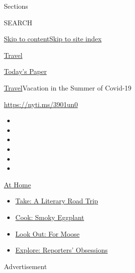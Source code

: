 Sections

SEARCH

\protect\hyperlink{site-content}{Skip to
content}\protect\hyperlink{site-index}{Skip to site index}

\href{https://www.nytimes.com/section/travel}{Travel}

\href{https://myaccount.nytimes.com/auth/login?response_type=cookie\&client_id=vi}{}

\href{https://www.nytimes.com/section/todayspaper}{Today's Paper}

\href{/section/travel}{Travel}\textbar{}Vacation in the Summer of
Covid-19

\url{https://nyti.ms/3901un0}

\begin{itemize}
\item
\item
\item
\item
\item
\item
\end{itemize}

\href{https://www.nytimes.com/spotlight/at-home?action=click\&pgtype=Article\&state=default\&region=TOP_BANNER\&context=at_home_menu}{At
Home}

\begin{itemize}
\tightlist
\item
  \href{https://www.nytimes.com/2020/07/28/books/time-for-a-literary-road-trip.html?action=click\&pgtype=Article\&state=default\&region=TOP_BANNER\&context=at_home_menu}{Take:
  A Literary Road Trip}
\item
  \href{https://www.nytimes.com/2020/07/29/magazine/bored-with-your-home-cooking-some-smoky-eggplant-will-fix-that.html?action=click\&pgtype=Article\&state=default\&region=TOP_BANNER\&context=at_home_menu}{Cook:
  Smoky Eggplant}
\item
  \href{https://www.nytimes.com/2020/07/27/travel/moose-michigan-isle-royale.html?action=click\&pgtype=Article\&state=default\&region=TOP_BANNER\&context=at_home_menu}{Look
  Out: For Moose}
\item
  \href{https://www.nytimes.com/interactive/2020/at-home/even-more-reporters-editors-diaries-lists-recommendations.html?action=click\&pgtype=Article\&state=default\&region=TOP_BANNER\&context=at_home_menu}{Explore:
  Reporters' Obsessions}
\end{itemize}

Advertisement


